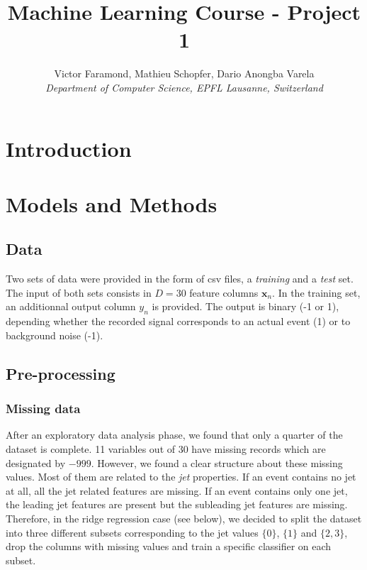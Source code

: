\documentclass[10pt,conference,compsocconf]{IEEEtran}
\begin{document}
\title{Machine Learning Course - Project 1}

\author{
  Victor Faramond, Mathieu Schopfer, Dario Anongba Varela\\
  \textit{Department of Computer Science, EPFL Lausanne, Switzerland}
}

\maketitle

\section{Introduction}

\section{Models and Methods}

\subsection{Data}

Two sets of data were provided in the form of csv files, a \textit{training} and a \textit{test} set. The input of both sets consists in $D=30$ feature columns $\mathbf{x}_n$. In the training set, an additionnal output column $y_n$ is provided. The output is binary (-1 or 1), depending whether the recorded signal corresponds to an actual event (1) or to background noise (-1).

\subsection{Pre-processing}
\subsubsection{Missing data} %
After an exploratory data analysis phase, we found that only a quarter of the dataset is complete. 11 variables out of 30 have missing records which are designated by $-999$. However, we found a clear structure about these missing values. Most of them are related to the \textit{jet} properties. If an event contains no jet at all, all the jet related features are missing. If an event contains only one jet, the leading jet features are present but the subleading jet features are missing. Therefore, in the ridge regression case (see below), we decided to split the dataset into three different subsets corresponding to the jet values $\{0\}$, $\{1\}$ and $\{2, 3\}$, drop the columns with missing values and train a specific classifier on each subset.
\end{document}
